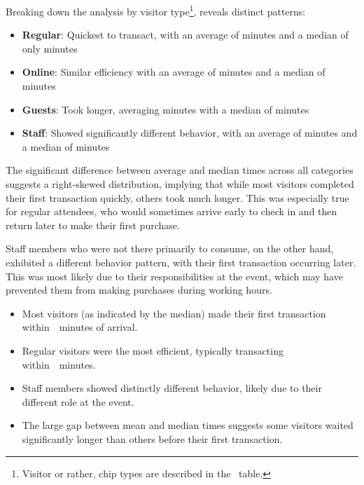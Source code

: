 Breaking down the analysis by visitor type\footnote{Visitor or rather, chip types are described in the~ table.}, reveals distinct patterns:
\begin{itemize}
	\item \textbf{Regular}: Quickest to transact, with an average of  minutes and a median of only  minutes
	\item \textbf{Online}: Similar efficiency with an average of  minutes and a median of  minutes
	\item \textbf{Guests}: Took longer, averaging  minutes with a median of  minutes
	\item \textbf{Staff}: Showed significantly different behavior, with an average of  minutes and a median of  minutes
\end{itemize}

The significant difference between average and median times across all categories suggests a right-skewed distribution, implying that while most visitors completed their first transaction quickly, others took much longer.
This was especially true for regular attendees, who would sometimes arrive early to check in and then return later to make their first purchase.

Staff members who were not there primarily to consume, on the other hand, exhibited a different behavior pattern, with their first transaction occurring later.
This was most likely due to their responsibilities at the event, which may have prevented them from making purchases during working hours.

\begin{keytakeaways}
	\begin{itemize}
		\item Most visitors (as indicated by the median) made their first transaction within~~minutes of arrival.
		\item Regular visitors were the most efficient, typically transacting within~~minutes.
		\item Staff members showed distinctly different behavior, likely due to their different role at the event.
		\item The large gap between mean and median times suggests some visitors waited significantly longer than others before their first transaction.
	\end{itemize}
\end{keytakeaways}

